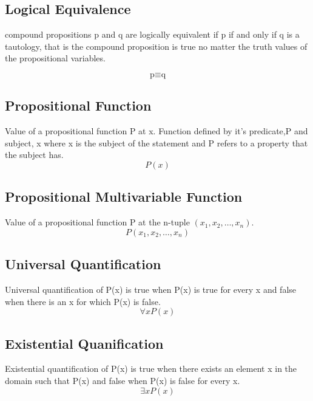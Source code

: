 \documentclass[12pt]{article}
\begin{document}
\subsection{Logical Equivalence}
compound propositions p and q are logically equivalent if 
p if and only if q is a tautology,
that is the compound proposition is true 
no matter the truth values of the propositional variables.

\begin{equation}
\mbox{p} \equiv \mbox{q}
\end{equation}

\subsection{Propositional Function}
Value of a propositional function P at x.
Function defined by it's predicate,P and subject, x
where
x is the subject of the statement and
P refers to a property that the subject has.
\begin{equation}
P(x)
\end{equation}

\subsection{Propositional Multivariable Function}
Value of a propositional function P at the n-tuple $(x_{1},x_{2},\dots,x_{n})$.
\begin{equation}
P(x_{1},x_{2},\dots,x_{n})
\end{equation}

\subsection{Universal Quantification}
Universal quantification of P(x)
is true
when
P(x) is true for every x
and false
when
there is an x for which P(x) is false.
\begin{equation}
\forall x P(x)
\end{equation}


\subsection{Existential Quanification}
Existential quantification of P(x)
is true
when
there exists an element x in the domain such that P(x)
and false
when
P(x) is false for every x.
\begin{equation}
\exists x P(x)
\end{equation}
\end{document}
